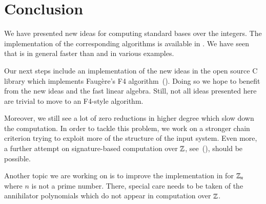 \section{Conclusion}
We have presented new ideas for computing standard bases over the integers. The
implementation of the corresponding algorithms is available in \singular. We
have seen that \singular is in general faster than \macaulay and \magma in
various examples.

Our next steps include an implementation of the new ideas in the open source C library
\gbl which implements Faug\`ere's F4 algorithm~(\cite{gbl}). Doing so we hope to
benefit from the new ideas and the fast linear algebra. Still, not all ideas
presented here are trivial to move to an F4-style algorithm.

Moreover, we still see a lot of zero reductions in higher degree which slow down
the computation. In order to tackle this problem, we work on a stronger chain
criterion trying to exploit more of the structure of the input system. Even
more, a further attempt on signature-based computation over $\mathbb{Z}$,
see~(\cite{eppSigZ2017}), should be possible.

Another topic we are working on is to improve the implementation in \singular
for $\mathbb{Z}_n$ where $n$ is not a prime number. There, special care needs to be
taken of the annihilator polynomials which do not appear in computation over $\mathbb{Z}$.

